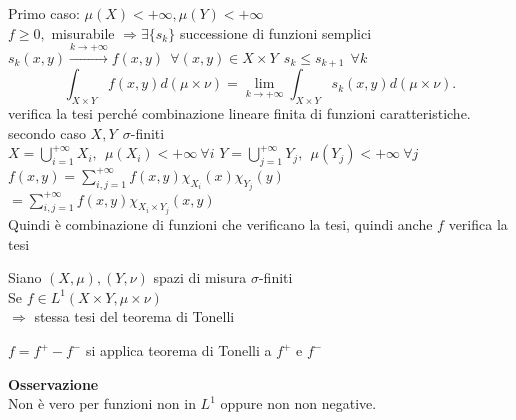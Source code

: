 \documentclass[12px]{article}
\begin{document}
\begin{dimo}
Primo caso: $\mu(X) < +\infty, \mu(Y) < +\infty$\\
$f \geq 0, $ misurabile  $ \Rightarrow  \exists \{s_k\}$ successione di funzioni semplici $s_k(x,y) \xrightarrow{ k \rightarrow +\infty} f(x,y) \ \ \forall (x,y)\in X\times Y \ \ s_k\leq s_{k+1}\ \ \forall k$\\
\[
	\int_{X\times Y}f(x,y) d (\mu\times\nu) = \lim_{ k \rightarrow+\infty} \int_{X\times Y}s_k (x,y)d (\mu\times\nu)
.\] 
verifica la tesi perché combinazione lineare finita di funzioni caratteristiche.\\
secondo caso $X,Y\ \ \sigma$-finiti\\
$X = \bigcup^{+\infty}_{i=1}X_i,\ \ \mu(X_i) < + \infty \ \forall i$
$Y = \bigcup^{+\infty}_{j=1}Y_j,\ \ \mu(Y_j) < + \infty \ \forall j$\\
$f(x,y) = \sum^{+\infty}_{i,j=1}f(x,y)\chi_{X_i}(x)\chi_{Y_j}(y)$\\
$= \sum^{+\infty}_{i,j=1}f(x,y)\chi_{X_i\times Y_j}(x,y)$\\
Quindi è combinazione di funzioni che verificano la tesi, quindi anche $f$ verifica la tesi

\end{dimo}
\begin{teo}[Fubini]
	Siano $(X,\mu), (Y,\nu)$ spazi di misura  $\sigma$-finiti\\
	Se $f\in L^1(X\times Y, \mu\times \nu)$\\
	 $ \Rightarrow $ stessa tesi del teorema di Tonelli 
\end{teo}
\begin{dimo}
	$f = f^+ - f^-$ si applica teorema di Tonelli a  $f^+$ e $f^-$
\end{dimo}
\textbf{Osservazione}\\
Non è vero per funzioni non in $L^1$ oppure non non negative.
	
\end{document}
